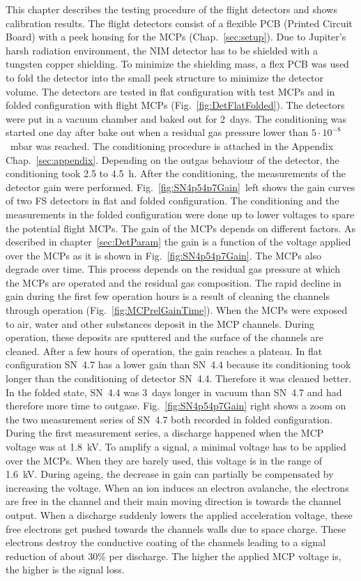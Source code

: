 	This chapter describes the testing procedure of the flight detectors and shows calibration results. The flight detectors consist of a flexible PCB (Printed Circuit Board) with a peek housing for the MCPs (Chap.~\ref{sec:setup}). Due to Jupiter's harsh radiation environment, the NIM detector has to be shielded with a tungsten copper shielding. To minimize the shielding mass, a flex PCB was used to fold the detector into the small peek structure to minimize the detector volume. The detectors are tested in flat configuration with test MCPs and in folded configuration with flight MCPs (Fig.~\ref{fig:DetFlatFolded}). The detectors were put in a vacuum chamber and baked out for 2~days. The conditioning was started one day after bake out when a residual gas pressure lower than $5\cdot10^{-8}$~mbar was reached. The conditioning procedure is attached in the Appendix Chap.~\ref{sec:appendix}. Depending on the outgas behaviour of the detector, the conditioning took 2.5 to 4.5~h. After the conditioning, the measurements of the detector gain were performed. Fig.~\ref{fig:SN4p54p7Gain}~left shows the gain curves of two FS detectors in flat and folded configuration. The conditioning and the measurements in the folded configuration were done up to lower voltages to spare the potential flight MCPs. The gain of the MCPs depends on different factors. As described in chapter~\ref{sec:DetParam} the gain is a function of the voltage applied over the MCPs as it is shown in Fig.~\ref{fig:SN4p54p7Gain}. The MCPs also degrade over time. This process depends on the residual gas pressure at which the MCPs are operated and the residual gas composition. The rapid decline in gain during the first few operation hours is a result of cleaning the channels through operation (Fig.~\ref{fig:MCPrelGainTime}). When the MCPs were exposed to air, water and other substances deposit in the MCP channels. During operation, these deposits are sputtered and the surface of the channels are cleaned. After a few hours of operation, the gain reaches a plateau. In flat configuration SN~4.7 has a lower gain than SN~4.4 because its conditioning took longer than the conditioning of detector SN~4.4. Therefore it was cleaned better. In the folded state, SN~4.4 was 3~days longer in vacuum than SN~4.7 and had therefore more time to outgase. Fig.~\ref{fig:SN4p54p7Gain} right shows a zoom on the two measurement series of SN~4.7 both recorded in folded configuration. During the first measurement series, a discharge happened when the MCP voltage was at 1.8~kV. To amplify a signal, a minimal voltage has to be applied over the MCPs. When they are barely used, this voltage is in the range of 1.6~kV. During ageing, the decrease in gain can partially be compensated by increasing the voltage. When an ion induces an electron avalanche, the electrons are free in the channel and their main moving direction is towards the channel output. When a discharge suddenly lowers the applied acceleration voltage, these free electrons get pushed towards the channels walls due to space charge. These electrons destroy the conductive coating of the channels leading to a signal reduction of about 30\% per discharge. The higher the applied MCP voltage is, the higher is the signal loss.\\
